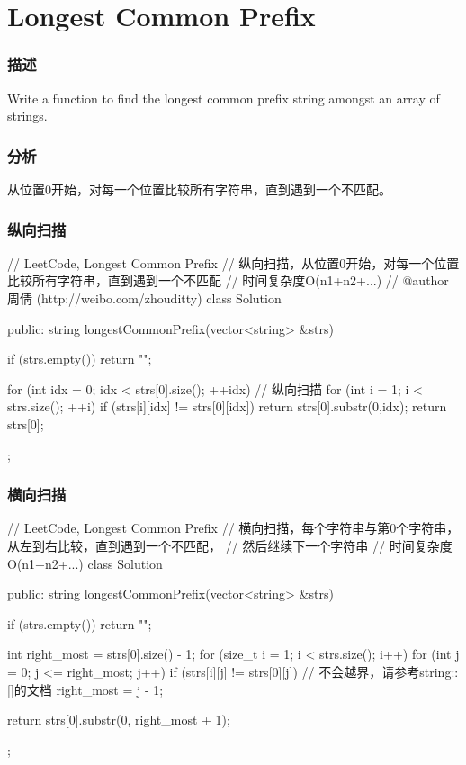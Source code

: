 \section{Longest Common Prefix} %
\label{sec:longest-common-prefix}


\subsubsection{描述}
Write a function to find the longest common prefix string amongst an array of strings.


\subsubsection{分析}
从位置0开始，对每一个位置比较所有字符串，直到遇到一个不匹配。


\subsubsection{纵向扫描}
\begin{Code}
// LeetCode, Longest Common Prefix
// 纵向扫描，从位置0开始，对每一个位置比较所有字符串，直到遇到一个不匹配
// 时间复杂度O(n1+n2+...)
// @author 周倩 (http://weibo.com/zhouditty)
class Solution {
public:
    string longestCommonPrefix(vector<string> &strs) {
        if (strs.empty()) return "";

        for (int idx = 0; idx < strs[0].size(); ++idx) { // 纵向扫描
            for (int i = 1; i < strs.size(); ++i) {
                if (strs[i][idx] != strs[0][idx]) return strs[0].substr(0,idx);
            }
        }
        return strs[0];
    }
};
\end{Code}


\subsubsection{横向扫描}
\begin{Code}
// LeetCode, Longest Common Prefix
// 横向扫描，每个字符串与第0个字符串，从左到右比较，直到遇到一个不匹配，
// 然后继续下一个字符串
// 时间复杂度O(n1+n2+...)
class Solution {
public:
    string longestCommonPrefix(vector<string> &strs) {
        if (strs.empty()) return "";

        int right_most = strs[0].size() - 1;
        for (size_t i = 1; i < strs.size(); i++)
            for (int j = 0; j <= right_most; j++)
                if (strs[i][j] != strs[0][j])  // 不会越界，请参考string::[]的文档
                    right_most = j - 1;

        return strs[0].substr(0, right_most + 1);
    }
};
\end{Code}


